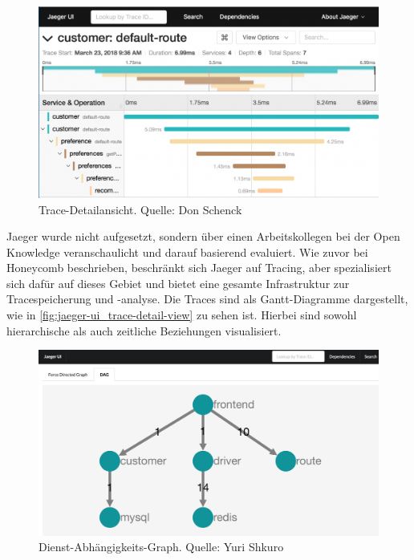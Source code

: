 \begin{figure}
\centering
\vspace{-\baselineskip}
\includegraphics[width=\linewidth]{img/03_methoden/redhat_jaeger-ui_trace-detail-view.png}
\caption{Trace-Detailansicht. Quelle: Don Schenck \cite{JaegerIstioTracing}}
\label{fig:jaeger-ui_trace-detail-view}
\end{figure}

Jaeger wurde nicht aufgesetzt, sondern über einen Arbeitskollegen bei der Open Knowledge veranschaulicht und darauf basierend evaluiert. Wie zuvor bei Honeycomb beschrieben, beschränkt sich Jaeger auf Tracing, aber spezialisiert sich dafür auf dieses Gebiet und bietet eine gesamte Infrastruktur zur Tracespeicherung und -analyse. Die Traces sind als Gantt-Diagramme dargestellt, wie in \autoref{fig:jaeger-ui_trace-detail-view} zu sehen ist. Hierbei sind sowohl hierarchische als auch zeitliche Beziehungen visualisiert.

\begin{figure}
\centering
\vspace{-\baselineskip}
\includegraphics[width=\linewidth]{img/03_methoden/medium_jaeger-ui_dependency-graph.png}
\caption{Dienst-Abhängigkeits-Graph. Quelle: Yuri Shkuro \cite{JaegerTakeOpenTracingForARide}}
\label{fig:jaeger-ui_dependency-graph}
\end{figure}

